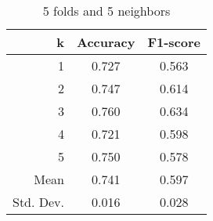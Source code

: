 \begin{table}
\centering
\caption{5 folds and 5 neighbors}
\begin{tabular}{rcc}
\toprule
         k &  Accuracy &  F1-score \\
\midrule
         1 &     0.727 &     0.563 \\
         2 &     0.747 &     0.614 \\
         3 &     0.760 &     0.634 \\
         4 &     0.721 &     0.598 \\
         5 &     0.750 &     0.578 \\
      Mean &     0.741 &     0.597 \\
 Std. Dev. &     0.016 &     0.028 \\
\bottomrule
\end{tabular}
\end{table}
